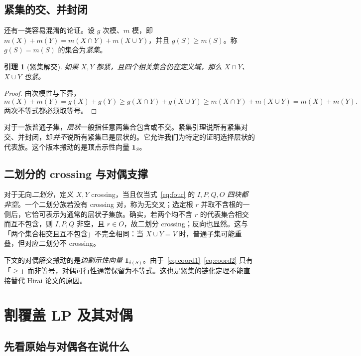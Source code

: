 \documentclass[UTF8,11pt,a4paper]{ctexart}
\newtheorem{lemma}[definition]{引理}
\newcommand{\cut}{\delta}
\begin{document}
\subsection{紧集的交、并封闭}

还有一类容易混淆的论证。设 $g$ 次模、$m$ 模，即 $m(X)+m(Y)=m(X\cap Y)+m(X\cup Y)$，并且 $g(S)\ge m(S)$。称 $g(S)=m(S)$ 的集合为\emph{紧集}。

\begin{lemma}[紧集解交]
如果 $X,Y$ 都紧，且四个相关集合仍在定义域，那么 $X\cap Y$、$X\cup Y$ 也紧。
\end{lemma}
\begin{proof}
由次模性与下界，
\[
m(X)+m(Y)=g(X)+g(Y)\ge g(X\cap Y)+g(X\cup Y)
\ge m(X\cap Y)+m(X\cup Y)=m(X)+m(Y).
\]
两次不等式都必须取等号。
\end{proof}

对于一族普通子集，\emph{层状}一般指任意两集合包含或不交。紧集引理说所有紧集对交、并封闭，却\emph{并不}说所有紧集已是层状的。它允许我们为特定的证明选择层状的代表族。这个版本搬动的是顶点示性向量 $\mathbf1_S$。

\subsection{二划分的 crossing 与对偶支撑}

对于无向\emph{二划分}，定义 $X,Y$ crossing，当且仅当式~\eqref{eq:four} 的 $I,P,Q,O$ \emph{四块都非空}。一个二划分族若没有 crossing 对，称为无交叉；选定根 $r$ 并取不含根的一侧后，它恰可表示为通常的层状子集族。确实，若两个均不含 $r$ 的代表集合相交而互不包含，则 $I,P,Q$ 非空，且 $r\in O$，故二划分 crossing；反向也显然。这与「两个集合相交且互不包含」不完全相同：当 $X\cup Y=V$ 时，普通子集可能重叠，但对应二划分不 crossing。

下文的对偶解交搬动的是\emph{边割示性向量} $\mathbf1_{\cut(S)}$。由于~\eqref{eq:coord1}--\eqref{eq:coord2} 只有「$\ge$」而非等号，对偶可行性通常保留为不等式。这也是紧集的链化定理不能直接替代 Hirai 论文的原因。

\section{割覆盖 LP 及其对偶}

\subsection{先看原始与对偶各在说什么}
\end{document}
